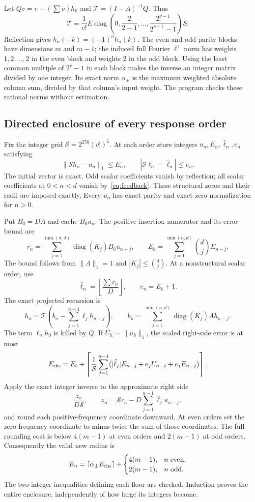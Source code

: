 \documentclass[11pt,a4paper]{article}
\theoremstyle{remark}\newtheorem*{ednote}{Editorial note (ProveIt, 2026-10-01)}
\begin{document}
Let $Qv=v-(\sum v)h_0$ and $\mathcal T=(I-A)^{-1}Q$. Thus
\[
 \mathcal T=\frac1{v!}E\operatorname{diag}\!\left(0,\frac2{2-1},\ldots,
 \frac{2^{v-1}}{2^{v-1}-1}\right)S.
\]
Reflection gives $h_n(-k)=(-1)^n h_n(k)$. The even and odd parity blocks have dimensions $m$ and $m-1$; the induced full Fourier $\ell^1$ norm has weights $1,2,\ldots,2$ in the even block and weights $2$ in the odd block. Using the least common multiple of $2^r-1$ in each block makes the inverse an integer matrix divided by one integer. Its exact norm $\alpha_\pm$ is the maximum weighted absolute column sum, divided by that column's input weight. The program checks these rational norms without estimation.

\subsection{Directed enclosure of every response order}
Fix the integer grid $\mathcal S=2^{256}(v!)^5$. At each order store integers $u_n,E_n,\widehat\ell_n,e_n$ satisfying
\[
 \|\mathcal S h_n-u_n\|_1\le E_n,\qquad
 |\mathcal S\ell_n-\widehat\ell_n|\le e_n.
\]
The initial vector is exact. Odd scalar coefficients vanish by reflection; all scalar coefficients at $0<n<d$ vanish by~\eqref{eq:feedback}. These structural zeros and their radii are imposed exactly. Every $u_n$ has exact parity and exact zero normalization for $n>0$.

Put $B_0=DA$ and cache $B_0u_n$. The positive-insertion numerator and its error bound are
\[
 r_n=\sum_{j=1}^{\min(n,d)}\operatorname{diag}(K_j)B_0u_{n-j},
 \qquad E_b=\sum_{j=1}^{\min(n,d)}\binom dj E_{n-j}.
\]
The bound follows from $\|A\|_1=1$ and $|K_j|\le\binom dj$. At a nonstructural scalar order, use
\[
 \widehat\ell_n=\left\lfloor\frac{\sum r_n}{D}\right\rfloor,
 \qquad e_n=E_b+1.
\]
The exact projected recursion is
\[
 h_n=\mathcal T\left(b_n-\sum_{j=1}^{n-1}\ell_jh_{n-j}\right),
 \qquad b_n=\sum_{j=1}^{\min(n,d)}\operatorname{diag}(K_j)Ah_{n-j}.
\]
The term $\ell_nh_0$ is killed by $Q$. If $U_h=\|u_h\|_1$, the scaled right-side error is at most
\[
 E_{\rm rhs}=E_b+\left\lceil\frac1{\mathcal S}
 \sum_{j=1}^{n-1}\bigl(|\widehat\ell_j|E_{n-j}+e_jU_{n-j}+e_jE_{n-j}\bigr)\right\rceil.
\]
Apply the exact integer inverse to the approximate right side
\[
 \frac{z_n}{D\mathcal S},\qquad
 z_n=\mathcal S r_n-D\sum_{j=1}^{n-1}\widehat\ell_j u_{n-j},
\]
and round each positive-frequency coordinate downward. At even orders set the zero-frequency coordinate to minus twice the sum of those coordinates. The full rounding cost is below $4(m-1)$ at even orders and $2(m-1)$ at odd orders. Consequently the valid new radius is
\[
 E_n=\lceil\alpha_\pm E_{\rm rhs}\rceil+
 \begin{cases}4(m-1),&n\text{ even},\\2(m-1),&n\text{ odd}.\end{cases}
\]
The two integer inequalities defining each floor are checked. Induction proves the entire enclosure, independently of how large its integers become.
\end{document}
